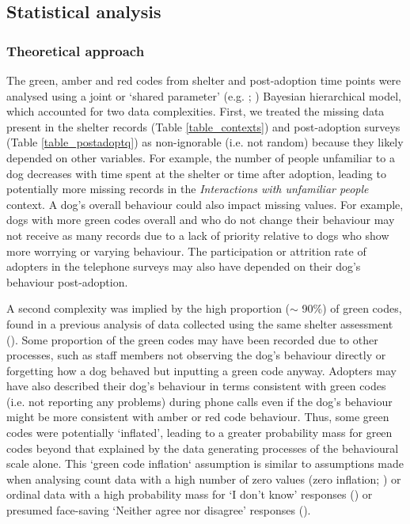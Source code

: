 \documentclass[12pt]{article}
\begin{document}
\subsection{Statistical analysis}

\subsubsection{Theoretical approach}\label{sec_theoretical_approach}
The green, amber and red codes from shelter and post-adoption time points were analysed using a joint or `shared parameter' (e.g. \cite{vonesh2006}; \cite{tseng2016}) Bayesian hierarchical model, which accounted for two data complexities. First, we treated the missing data present in the shelter records (Table \ref{table_contexts}) and post-adoption surveys (Table \ref{table_postadoptq}) as non-ignorable (i.e. not random) because they likely depended on other variables. For example, the number of people unfamiliar to a dog decreases with time spent at the shelter or time after adoption, leading to potentially more missing records in the \textit{Interactions with unfamiliar people} context. A dog’s overall behaviour could also impact missing values. For example, dogs with more green codes overall and who do not change their behaviour may not receive as many records due to a lack of priority relative to dogs who show more worrying or varying behaviour. The participation or attrition rate of adopters in the telephone surveys may also have depended on their dog’s behaviour post-adoption.

A second complexity was implied by the high proportion ($\sim$ 90\%) of green codes, found in a previous analysis of data collected using the same shelter assessment (\cite{goold2017modelling}). Some proportion of the green codes may have been recorded due to other processes, such as staff members not observing the dog’s behaviour directly or forgetting how a dog behaved but inputting a green code anyway. Adopters may have also described their dog’s behaviour in terms consistent with green codes (i.e. not reporting any problems) during phone calls even if the dog’s behaviour might be more consistent with amber or red code behaviour. Thus, some green codes were potentially ‘inflated’, leading to a greater probability mass for green codes beyond that explained by the data generating processes of the behavioural scale alone. This `green code inflation` assumption is similar to assumptions made when analysing count data with a high number of zero values (zero inflation; \cite{lambert1992}) or ordinal data with a high probability mass for ‘I don’t know’ responses (\cite{kelley2008}) or presumed face-saving ‘Neither agree nor disagree’ responses (\cite{bagozzi2012}).
\end{document}
